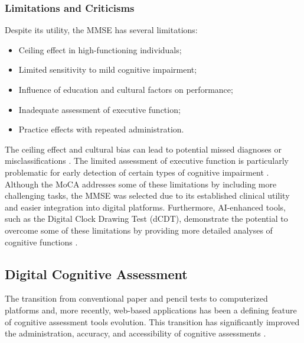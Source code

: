 \subsubsection{Limitations and Criticisms}
Despite its utility, the MMSE has several limitations:
\begin{itemize}
    \item Ceiling effect in high-functioning individuals;
    \item Limited sensitivity to mild cognitive impairment;
    \item Influence of education and cultural factors on performance;
    \item Inadequate assessment of executive function;
    \item Practice effects with repeated administration.
\end{itemize}
The ceiling effect and cultural bias can lead to potential missed diagnoses or misclassifications \cite{FrancoMarina2010, Kim2010}. The limited assessment of executive function is particularly problematic for early detection of certain types of cognitive impairment \cite{Diamond2013}. Although the MoCA addresses some of these limitations by including more challenging tasks, the MMSE was selected due to its established clinical utility and easier integration into digital platforms. Furthermore, AI-enhanced tools, such as the Digital Clock Drawing Test (dCDT), demonstrate the potential to overcome some of these limitations by providing more detailed analyses of cognitive functions \cite{Jiménez-Mesa2023}.

\subsection{Digital Cognitive Assessment}
The transition from conventional paper and pencil tests to computerized platforms and, more recently, web-based applications has been a defining feature of cognitive assessment tools evolution. This transition has significantly improved the administration, accuracy, and accessibility of cognitive assessments \cite{Bauer2012, Zygouris2017}.

